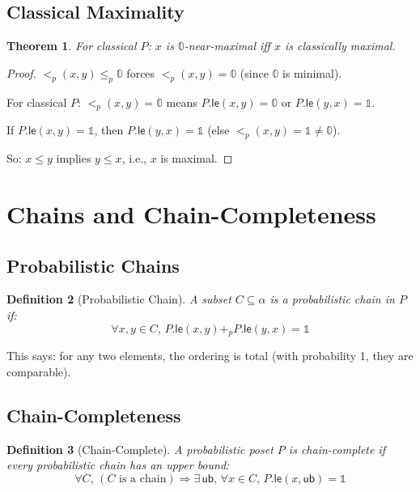 \documentclass[11pt,a4paper]{article}
\newtheorem{theorem}{Theorem}[section]
\newtheorem{definition}[theorem]{Definition}
\newcommand{\pzero}{\mathbb{0}}
\newcommand{\pone}{\mathbb{1}}
\newcommand{\ple}{\leq_p}
\newcommand{\plt}{<_p}
\newcommand{\padd}{+_p}
\begin{document}
\subsection{Classical Maximality}

\begin{theorem}
For classical $P$: $x$ is $\pzero$-near-maximal iff $x$ is classically maximal.
\end{theorem}

\begin{proof}
$\plt(x, y) \ple \pzero$ forces $\plt(x, y) = \pzero$ (since $\pzero$ is minimal).

For classical $P$: $\plt(x, y) = \pzero$ means $P.\mathsf{le}(x, y) = \pzero$ or $P.\mathsf{le}(y, x) = \pone$.

If $P.\mathsf{le}(x, y) = \pone$, then $P.\mathsf{le}(y, x) = \pone$ (else $\plt(x,y) = \pone \neq \pzero$).

So: $x \leq y$ implies $y \leq x$, i.e., $x$ is maximal.
\end{proof}

\section{Chains and Chain-Completeness}

\subsection{Probabilistic Chains}

\begin{definition}[Probabilistic Chain]
A subset $C \subseteq \alpha$ is a \emph{probabilistic chain} in $P$ if:
\[
\forall x, y \in C,\, P.\mathsf{le}(x, y) \padd P.\mathsf{le}(y, x) = \pone
\]
\end{definition}

This says: for any two elements, the ordering is total (with probability 1, they are comparable).

\subsection{Chain-Completeness}

\begin{definition}[Chain-Complete]
A probabilistic poset $P$ is \emph{chain-complete} if every probabilistic chain has an upper bound:
\[
\forall C,\, (\text{$C$ is a chain}) \Rightarrow \exists\, \mathsf{ub},\, \forall x \in C,\, P.\mathsf{le}(x, \mathsf{ub}) = \pone
\]
\end{definition}
\end{document}

